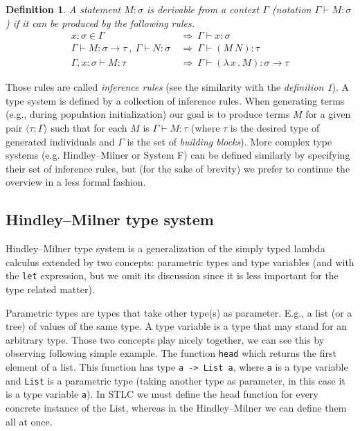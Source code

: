 \documentclass[11pt]{article}
\newtheorem{definition}{Definition}
\newcommand{\tur}[3]{#1\vdash{}#2 \colon #3}
\newcommand{\then}{\Rightarrow\xspace}
\newcommand{\lamb}[2]{( \lambda \, #1 \, . \, #2 )}
\newcommand{\ar}{\rightarrow\xspace}
\newcommand{\HM}{Hindley–Milner\xspace}
\newcommand{\ul}[2]{\langle #1 ; #2 \rangle}
\begin{document}
\begin{article}
\begin{definition}
A statement $M\colon\sigma$ is \textit{derivable from}
a context $\Gamma$ (notation 
\mbox{$\Gamma\vdash{}M\colon\sigma$}) 
if it can be produced by the following rules.
\begin{align*}
x : \sigma \in \Gamma &~\then~ \tur{\Gamma}{x}{\sigma}\\
\tur{\Gamma}{M}{\sigma \ar \tau}~,~\tur{\Gamma}{N}{\sigma} 
&~\then~ \tur{\Gamma}{(M~N)}{\tau}\\  
\tur{\Gamma,x:\sigma}{M}{\tau}
&~\then~ \tur{\Gamma}{\lamb{x}{M}}{\sigma \ar \tau} 
\end{align*}
\end{definition}

Those rules are called \textit{inference rules} (see the similarity with the \textit{definition 1}). A type system is defined by a collection of inference rules. When generating terms (e.g., during population initialization) our goal is to produce terms $M$ for a given pair $\ul{\tau}{\Gamma}$ such that for each $M$ is $\tur{\Gamma}{M}{\tau}$ (where $\tau$ is the desired type of generated individuals and $\Gamma$ is the set of \textit{building blocks}). 
More complex type systems (e.g. \HM or System F) can be defined similarly by specifying their set of inference rules, but (for the sake of brevity) we prefer to continue the overview in a less formal fashion.


\subsection{\HM type system}

\HM type system \citep{hindley1969principal} is a generalization of the simply typed lambda calculus extended by two concepts: parametric types and type variables (and with the \texttt{let} expression, but we omit its discussion since it is less important for the type related matter).

Parametric types are types that take other type(s) as parameter. E.g., a list (or a tree) of values of the same type. 
A type variable is a type that may stand for an arbitrary type. 
Those two concepts play nicely together, we can see this by observing following simple example. The function \texttt{head} which returns the first element of a list. This function has type \texttt{a -> List a}, where \texttt{a} is a type variable and \texttt{List} is a parametric type (taking another type as parameter, in this case it is a type variable \texttt{a}). In STLC we must define the head function for every concrete instance of the List, whereas in the \HM we can define them all at once. 
 

\end{article}
\end{document}

